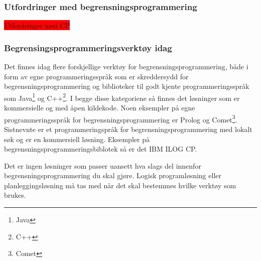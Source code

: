 \subsubsection{Utfordringer med begrensningsprogrammering}
\colorbox{red}{Utfordringer med CP}

\subsubsection{Begrensingsprogrammeringsverktøy idag}
Det finnes idag flere forskjellige verktøy for begrensningsprogrammering, både i form av egne programmeringsspråk som er skreddersydd for begrensningsprogrammering og biblioteker til godt kjente programmeringsspråk som Java\footnote{Java} og C++\footnote{C++}. I begge disse kategoriene så finnes det løsninger som er kommersielle og med åpen kildekode. Noen eksempler på egne programmeringsspråk for begrensningsprogrammering er Prolog og Comet\footnote{Comet}. Sistnevnte er et programmeringspråk for begrensningsprogrammering med lokalt søk og er en kommersiell løsning. Eksempler på begrensningsprogrammeringsbiblotek så er det IBM ILOG CP.

Det er ingen løsninger som passer uansett hva slags del innenfor begrensningsprogrammering du skal gjøre. Logisk programløsning eller planleggingsløsning må tas med når det skal bestemmes hvilke verktøy som brukes.


